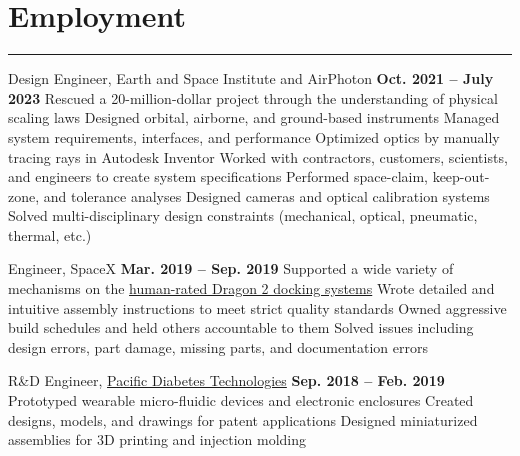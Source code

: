 \vfill
\section{Employment}
\noindent\rule{\textwidth}{\hlinewidth}

\begin{innerlist}
    \item Design Engineer, Earth and Space Institute and AirPhoton
		\hfill\textbf{Oct. 2021 -- July 2023}
        \subitem Rescued a 20-million-dollar project through the understanding of physical scaling laws
        \subitem Designed orbital, airborne, and ground-based instruments
        \subitem Managed system requirements, interfaces, and performance
        \subitem Optimized optics by manually tracing rays in Autodesk Inventor
        \subitem Worked with contractors, customers, scientists, and engineers to create system specifications
        \subitem Performed space-claim, keep-out-zone, and tolerance analyses 
        \subitem Designed cameras and optical calibration systems
        \subitem Solved multi-disciplinary design constraints (mechanical, optical, pneumatic, thermal, etc.)
	\item Engineer, SpaceX 
		\hfill\textbf{Mar. 2019 -- Sep. 2019}
		\subitem Supported a wide variety of mechanisms on the 
            \href{https://en.wikipedia.org/wiki/Dragon_2}{human-rated Dragon 2 docking systems}
		\subitem Wrote detailed and intuitive assembly instructions to meet strict quality standards
		\subitem Owned aggressive build schedules and held others accountable to them
		\subitem Solved issues including design errors, part damage, missing parts, and documentation errors
    \item R\&D Engineer, \href{http://pacificdt.com/}{Pacific Diabetes Technologies} 
		\hfill\textbf{Sep. 2018 -- Feb. 2019} %
        \subitem Prototyped wearable micro-fluidic devices and electronic enclosures
		\subitem Created designs, models, and drawings for patent applications
		\subitem Designed miniaturized assemblies for 3D printing and injection molding
\end{innerlist}

